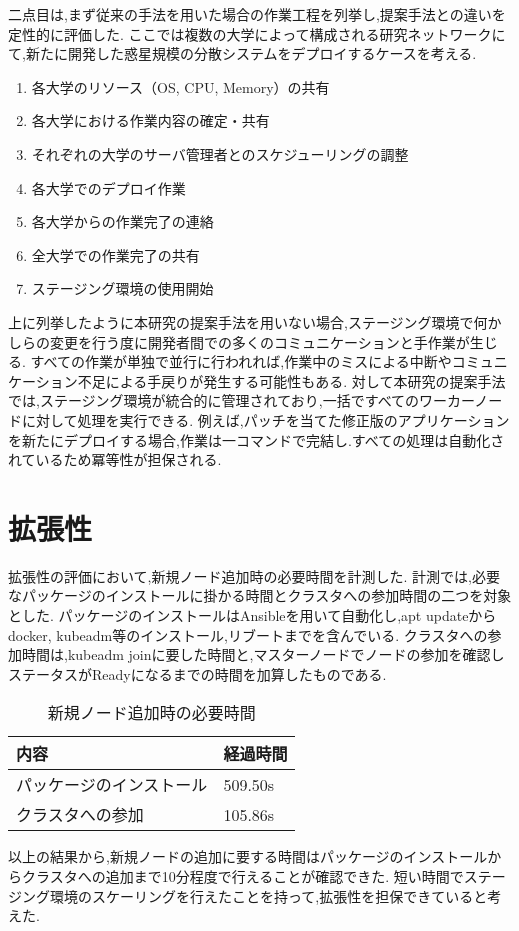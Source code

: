 二点目は,まず従来の手法を用いた場合の作業工程を列挙し,提案手法との違いを定性的に評価した.
ここでは複数の大学によって構成される研究ネットワークにて,新たに開発した惑星規模の分散システムをデプロイするケースを考える.

\begin{enumerate}
  \item 各大学のリソース（OS, CPU, Memory）の共有
  \item 各大学における作業内容の確定・共有
  \item それぞれの大学のサーバ管理者とのスケジューリングの調整
  \item 各大学でのデプロイ作業
  \item 各大学からの作業完了の連絡
  \item 全大学での作業完了の共有
  \item ステージング環境の使用開始
\end{enumerate}

上に列挙したように本研究の提案手法を用いない場合,ステージング環境で何かしらの変更を行う度に開発者間での多くのコミュニケーションと手作業が生じる.
すべての作業が単独で並行に行われれば,作業中のミスによる中断やコミュニケーション不足による手戻りが発生する可能性もある.
対して本研究の提案手法では,ステージング環境が統合的に管理されており,一括ですべてのワーカーノードに対して処理を実行できる.
例えば,パッチを当てた修正版のアプリケーションを新たにデプロイする場合,作業は一コマンドで完結し.すべての処理は自動化されているため冪等性が担保される.

\section{拡張性}
\label{evaluation:method}

拡張性の評価において,新規ノード追加時の必要時間を計測した.
計測では,必要なパッケージのインストールに掛かる時間とクラスタへの参加時間の二つを対象とした.
パッケージのインストールはAnsibleを用いて自動化し,apt updateからdocker, kubeadm等のインストール,リブートまでを含んでいる.
クラスタへの参加時間は,kubeadm joinに要した時間と,マスターノードでノードの参加を確認しステータスがReadyになるまでの時間を加算したものである.

\begin{table}[htb]
  \begin{center}
    \caption{新規ノード追加時の必要時間}
    \begin{tabular}{|l|l|} \hline
      内容 & 経過時間 \\ \hline
      パッケージのインストール & 509.50s \\ \hline
      クラスタへの参加 & 105.86s \\ \hline
    \end{tabular}
  \end{center}
\end{table}

以上の結果から,新規ノードの追加に要する時間はパッケージのインストールからクラスタへの追加まで10分程度で行えることが確認できた.
短い時間でステージング環境のスケーリングを行えたことを持って,拡張性を担保できていると考えた.

